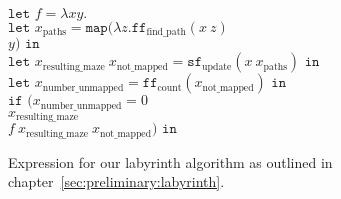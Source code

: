 \begin{figure}[p]
    $\texttt{let } f = \lambda x y.$\\
    \hspace*{.3cm}$\texttt{let } x_\text{paths} = \texttt{map} (\lambda z.\texttt{ff}_\text{find\_path} (x\ z)$\\
    \hspace*{3.2cm}$y) \texttt{ in}$\\
    \hspace*{.6cm}$\texttt{let } x_\text{resulting\_maze}\ x_\text{not\_mapped} = \texttt{sf}_\text{update}(x\ x_\text{paths}) \texttt{ in}$\\
    \hspace*{.9cm}$\texttt{let } x_\text{number\_unmapped} = \texttt{ff}_\text{count} (x_\text{not\_mapped}) \texttt{ in}$\\
    \hspace*{1.2cm}$\texttt{if } (x_\text{number\_unmapped} = 0$\\
    \hspace*{2cm}$x_\text{resulting\_maze}$\\
    \hspace*{2cm}$f\ x_\text{resulting\_maze}\ x_\text{not\_mapped}) \texttt{ in}$\\
    \caption{Expression for our labyrinth algorithm as outlined in chapter~\ref{sec:preliminary:labyrinth}.}%
    \label{fig:transformations:ir-first-stage}
\end{figure}

